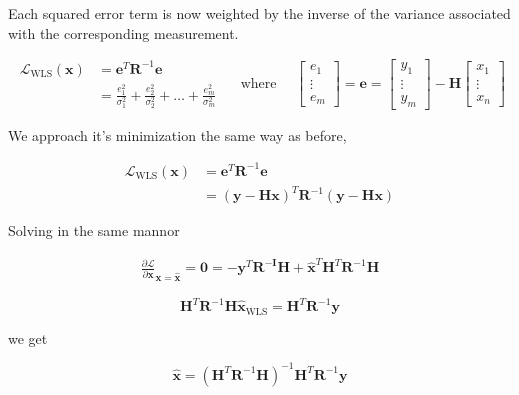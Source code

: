 \documentclass[a4paper]{article}
\begin{document}
Each squared error term is now weighted by the inverse of the variance
associated with the corresponding measurement.

$$\begin{aligned} \mathscr{L}_{\mathrm{WLS}}(\mathbf{x}) &=\mathbf{e}^{T} \mathbf{R}^{-1} \mathbf{e} \\ &=\frac{e_{1}^{2}}{\sigma_{1}^{2}}+\frac{e_{2}^{2}}{\sigma_{2}^{2}}+\ldots+\frac{e_{m}^{2}}{\sigma_{m}^{2}} \end{aligned} \quad \text { where } \quad\left[\begin{array}{c}{e_{1}} \\ {\vdots} \\ {e_{m}}\end{array}\right]=\mathbf{e}=\left[\begin{array}{c}{y_{1}} \\ {\vdots} \\ {y_{m}}\end{array}\right]-\mathbf{H}\left[\begin{array}{c}{x_{1}} \\ {\vdots} \\ {x_{n}}\end{array}\right]$$

We approach it's minimization the same way as before,

$$\begin{aligned} \mathscr{L}_{\mathrm{WLS}}(\mathbf{x}) &=\mathbf{e}^{T} \mathbf{R}^{-1} \mathbf{e} \\ &=(\mathbf{y}-\mathbf{H} \mathbf{x})^{T} \mathbf{R}^{-1}(\mathbf{y}-\mathbf{H} \mathbf{x}) \end{aligned}$$

Solving in the same mannor

$$\begin{array}{c}
  \frac{\partial \mathscr{L}}{\partial \mathbf{x}}_{\mathbf{x}=\mathbf{\hat{x}}}
=\mathbf{0}=-\mathbf{y}^{T} \mathbf{R}^{-\mathbf{I}} \mathbf{H}+\hat{\mathbf{x}}^{T} 
\mathbf{H}^{T} \mathbf{R}^{-1} \mathbf{H} 
\end{array}$$

$$\mathbf{H}^{T} \mathbf{R}^{-1} \mathbf{H} \hat{\mathbf{x}}_{\text{WLS}}=\mathbf{H}^{T} \mathbf{R}^{-1} \mathbf{y}$$

we get

$$\hat{\mathbf{x}}=\left(\mathbf{H}^{T} \mathbf{R}^{-1} \mathbf{H}\right)^{-1} \mathbf{H}^{T} \mathbf{R}^{-1} \mathbf{y}$$
\end{document}
